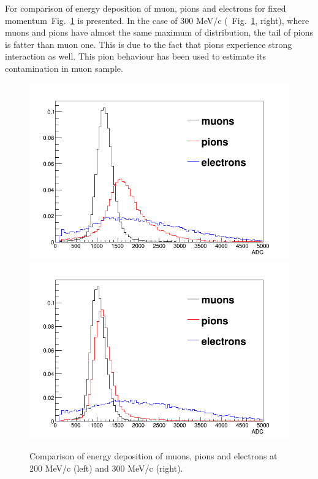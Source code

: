 For comparison of energy deposition of muon, pions and electrons for fixed momentum~Fig.~\ref{fig:KL_mu_to_pi} is presented. In the case of 300 MeV/c (~Fig.~\ref{fig:KL_mu_to_pi}, right), where muons and pions have almost the same maximum of distribution, the tail of pions is fatter than muon one. This is due to the fact that pions experience strong interaction as well. This pion behaviour has been used to estimate its contamination in muon sample. 


\begin{figure}
 	\begin{center}
 		\includegraphics[width=0.4\columnwidth]{./04-KL/Figures/mu_vs_pi_vs_e_200MEV.png}  		\includegraphics[width=0.4\columnwidth]{./04-KL/Figures/mu_vs_pi_vs_e_300MEV.png}
 		\caption{Comparison of energy deposition of muons, pions and electrons at 200 MeV/c (left) and 300 MeV/c (right).}
 		\label{fig:KL_mu_to_pi}
 	\end{center}
\end{figure}

       
